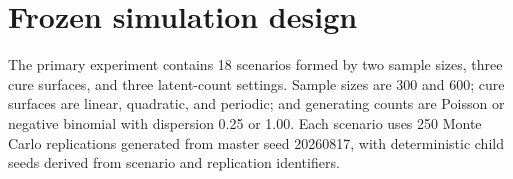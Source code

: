 \documentclass[11pt]{article}
\begin{document}


\section{Frozen simulation design}\label{sec:supp-simulation}

The primary experiment contains 18 scenarios formed by two
sample sizes, three cure surfaces, and three latent-count
settings. Sample sizes are 300 and 600; cure surfaces are
linear, quadratic, and periodic; and generating counts are
Poisson or negative binomial with dispersion 0.25 or 1.00.
Each scenario uses 250 Monte Carlo replications generated from
master seed 20260817, with deterministic child seeds derived
from scenario and replication identifiers.
\end{document}
